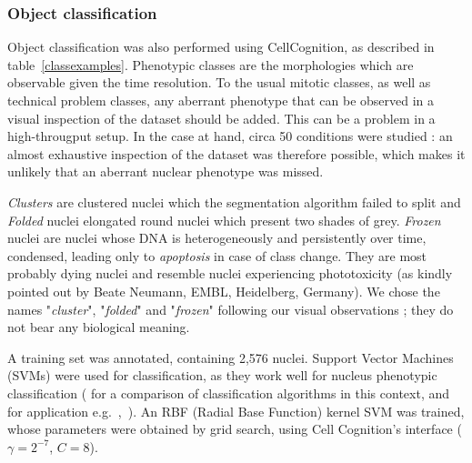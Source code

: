 \subsubsection{Object classification}
Object classification was also performed using CellCognition, as described in table~\ref{classexamples}. Phenotypic classes are the morphologies which are observable given the time resolution. To the usual mitotic classes, as well as technical problem classes, any aberrant phenotype that can be observed in a visual inspection of the dataset should be added. This can be a problem in a high-througput setup. In the case at hand, circa 50 conditions were studied : an almost exhaustive inspection of the dataset was therefore possible, which makes it unlikely that an aberrant nuclear phenotype was missed.

\textit{Clusters} are clustered nuclei which the segmentation algorithm failed to split and \textit{Folded} nuclei elongated round nuclei which present two shades of grey. \textit{Frozen} nuclei are nuclei whose DNA is heterogeneously and persistently over time, condensed, leading only to \textit{apoptosis} in case of class change. They are most probably dying nuclei and resemble nuclei experiencing phototoxicity (as kindly pointed out by Beate Neumann, EMBL, Heidelberg, Germany). We chose the names "\textit{cluster}", "\textit{folded}" and "\textit{frozen}" following our visual observations ; they do not bear any biological meaning.

A training set was annotated, containing 2,576 nuclei. Support Vector Machines (SVMs) were used for classification, as they work well for nucleus phenotypic classification (\cite{kovalev} for a comparison of classification algorithms in this context, and for application e.g.~\cite{cellcognition},~\cite{Walter2010}). An RBF (Radial Base Function) kernel SVM was trained, whose parameters were obtained by grid search, using Cell Cognition's interface ($\gamma=2^{-7}$, $C=8$).%

